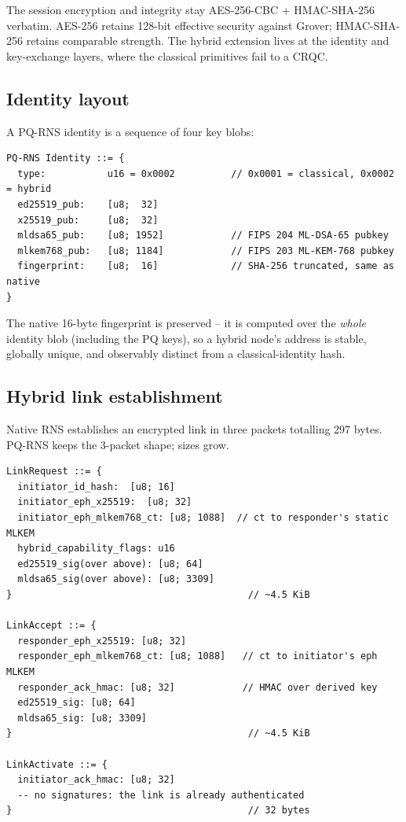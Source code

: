 \documentclass[11pt,a4paper]{article}
\begin{document}
The session encryption and integrity stay AES-256-CBC + HMAC-SHA-256
verbatim. AES-256 retains 128-bit effective security against Grover;
HMAC-SHA-256 retains comparable strength. The hybrid extension lives
at the identity and key-exchange layers, where the classical
primitives fail to a CRQC.

\subsection{Identity layout}

A PQ-RNS identity is a sequence of four key blobs:

\begin{lstlisting}[caption={Hybrid identity wire layout.}]
PQ-RNS Identity ::= {
  type:           u16 = 0x0002          // 0x0001 = classical, 0x0002 = hybrid
  ed25519_pub:    [u8;  32]
  x25519_pub:     [u8;  32]
  mldsa65_pub:    [u8; 1952]            // FIPS 204 ML-DSA-65 pubkey
  mlkem768_pub:   [u8; 1184]            // FIPS 203 ML-KEM-768 pubkey
  fingerprint:    [u8;  16]             // SHA-256 truncated, same as native
}
\end{lstlisting}

The native 16-byte fingerprint is preserved -- it is computed over the
\emph{whole} identity blob (including the PQ keys), so a hybrid node's
address is stable, globally unique, and observably distinct from a
classical-identity hash.

\subsection{Hybrid link establishment}

Native RNS establishes an encrypted link in three packets totalling
297 bytes. PQ-RNS keeps the 3-packet shape; sizes grow.

\begin{lstlisting}[caption={Hybrid link-establishment packets.}]
LinkRequest ::= {
  initiator_id_hash:  [u8; 16]
  initiator_eph_x25519:  [u8; 32]
  initiator_eph_mlkem768_ct: [u8; 1088]  // ct to responder's static MLKEM
  hybrid_capability_flags: u16
  ed25519_sig(over above): [u8; 64]
  mldsa65_sig(over above): [u8; 3309]
}                                          // ~4.5 KiB

LinkAccept ::= {
  responder_eph_x25519: [u8; 32]
  responder_eph_mlkem768_ct: [u8; 1088]   // ct to initiator's eph MLKEM
  responder_ack_hmac: [u8; 32]            // HMAC over derived key
  ed25519_sig: [u8; 64]
  mldsa65_sig: [u8; 3309]
}                                          // ~4.5 KiB

LinkActivate ::= {
  initiator_ack_hmac: [u8; 32]
  -- no signatures: the link is already authenticated
}                                          // 32 bytes
\end{lstlisting}
\end{document}
